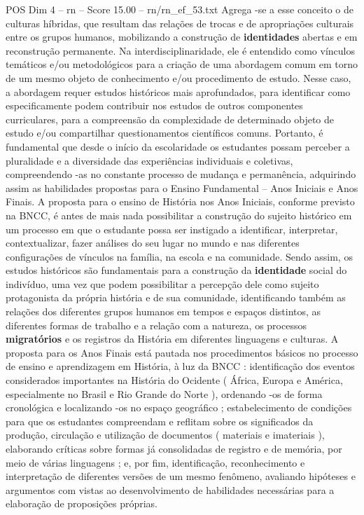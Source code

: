 \begin{textsample}{POS Dim 4 – rn – Score 15.00 – rn/rn\_ef\_53.txt}
Agrega -se a esse conceito o de culturas híbridas, que resultam das relações de trocas e de apropriações culturais entre os grupos humanos, mobilizando a construção de \textbf{identidades} abertas e em reconstrução permanente.
Na interdisciplinaridade, ele é entendido como vínculos temáticos e/ou metodológicos para a criação de uma abordagem comum em torno de um mesmo objeto de conhecimento e/ou procedimento de estudo.
Nesse caso, a abordagem requer estudos históricos mais aprofundados, para identificar como especificamente podem contribuir nos estudos de outros componentes curriculares, para a compreensão da complexidade de determinado objeto de estudo e/ou compartilhar questionamentos científicos comuns.
Portanto, é fundamental que desde o início da escolaridade os estudantes possam perceber a pluralidade e a diversidade das experiências individuais e coletivas, compreendendo -as no constante processo de mudança e permanência, adquirindo assim as habilidades propostas para o Ensino Fundamental – Anos Iniciais e Anos Finais.
A proposta para o ensino de História nos Anos Iniciais, conforme previsto na BNCC, é antes de mais nada possibilitar a construção do sujeito histórico em um processo em que o estudante possa ser instigado a identificar, interpretar, contextualizar, fazer análises do seu lugar no mundo e nas diferentes configurações de vínculos na família, na escola e na comunidade.
Sendo assim, os estudos históricos são fundamentais para a construção da \textbf{identidade} social do indivíduo, uma vez que podem possibilitar a percepção dele como sujeito protagonista da própria história e de sua comunidade, identificando também as relações dos diferentes grupos humanos em tempos e espaços distintos, as diferentes formas de trabalho e a relação com a natureza, os processos \textbf{migratórios} e os registros da História em diferentes linguagens e culturas.
A proposta para os Anos Finais está pautada nos procedimentos básicos no processo de ensino e aprendizagem em História, à luz da BNCC : identificação dos eventos considerados importantes na História do Ocidente ( África, Europa e América, especialmente no Brasil e Rio Grande do Norte ), ordenando -os de forma cronológica e localizando -os no espaço geográfico ; estabelecimento de condições para que os estudantes compreendam e reflitam sobre os significados da produção, circulação e utilização de documentos ( materiais e imateriais ), elaborando críticas sobre formas já consolidadas de registro e de memória, por meio de várias linguagens ; e, por fim, identificação, reconhecimento e interpretação de diferentes versões de um mesmo fenômeno, avaliando hipóteses e argumentos com vistas ao desenvolvimento de habilidades necessárias para a elaboração de proposições próprias.

\end{textsample}
